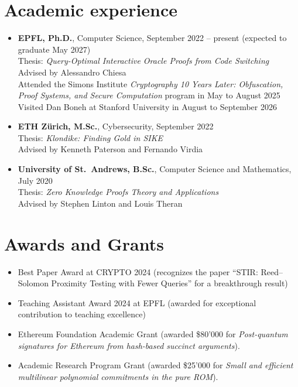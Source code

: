 \documentclass[11pt,a4paper]{article}
\begin{document}
\section*{Academic experience}
\begin{itemize}
  \item \textbf{EPFL, Ph.D.}, Computer Science, September 2022 -- present (expected to graduate May 2027) \\
  Thesis: \emph{Query-Optimal Interactive Oracle Proofs from Code Switching} \\
  Advised by Alessandro Chiesa \\
  Attended the Simons Institute \emph{Cryptography 10 Years Later: Obfuscation, Proof Systems, and Secure Computation} program in May to August 2025 \\
  Visited Dan Boneh at Stanford University in August to September 2026

  \item \textbf{ETH Z\"urich, M.Sc.}, Cybersecurity, September 2022 \\
  Thesis: \emph{Klondike: Finding Gold in SIKE} \\
  Advised by Kenneth Paterson and Fernando Virdia

  \item \textbf{University of St.\ Andrews, B.Sc.}, Computer Science and Mathematics, July 2020 \\
  Thesis: \emph{Zero Knowledge Proofs Theory and Applications} \\
  Advised by Stephen Linton and Louis Theran
\end{itemize}

\section*{Awards and Grants}
\begin{itemize}
  \item Best Paper Award at CRYPTO 2024 (recognizes the paper ``STIR: Reed–Solomon Proximity Testing with Fewer Queries'' for a breakthrough result)
  \item Teaching Assistant Award 2024 at EPFL (awarded for exceptional contribution to teaching excellence)
  \item Ethereum Foundation Academic Grant (awarded \$80'000 for \emph{Post-quantum signatures for Ethereum from hash-based succinct arguments}).
  \item Academic Research Program Grant (awarded \$25'000 for \emph{Small and efficient multilinear polynomial commitments in the pure ROM}).
\end{itemize}
\end{document}
